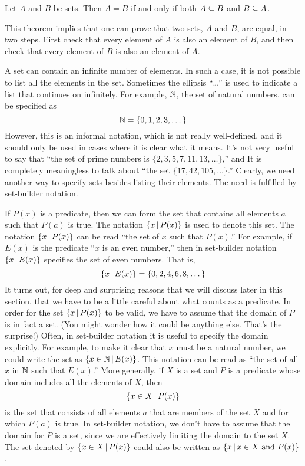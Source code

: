 \begin{theorem}\label{T-setequality}
Let $A$ and $B$ be sets.  Then $A=B$ if and only if both $A\subseteq B$ and $B\subseteq A$.
\end{theorem}

This theorem implies that one can prove that two sets, $A$ and $B$, are equal, in two steps.
First check that every element of $A$ is also an element of $B$, and then check that every element of $B$ is also an element of $A$.
 
\medbreak

A set can contain an infinite number of elements.
In such a case, it is not possible to list all the elements in the set.
Sometimes the ellipsis ``\dots'' is used to indicate a list that continues on infinitely.
For example, ${\mathbb N}$, the set of natural numbers, can be specified as
\[{\mathbb N} = \{ 0, 1, 2, 3, \dots \}\]
However, this is an informal notation, which is not really well-defined, and it should only be used in cases where it is clear what it means.
It's not very useful to say that ``the set of prime numbers is $\{2,3,5,7,11,13,\dots\}$,'' and It is completely meaningless to talk about ``the set $\{17,42,105,\dots\}$.''
Clearly, we need another way to specify sets besides listing their elements.
The need is fulfilled by set-builder notation.

If $P(x)$ is a predicate, then we can form the set that contains all elements $a$ such that $P(a)$ is true.
The notation $\{x \,|\, P(x)\}$ is used to denote this set.
The notation $\{x\,|\, P(x)\}$ can be read ``the set of $x$ such that $P(x)$.''
For example, if $E(x)$ is the predicate ``$x$ is an even number,'' then in set-builder notation $\{x\,|\, E(x)\}$ specifies the set of even numbers.
That is, 
\[\{x\,|\, E(x)\} = \{0,2,4,6,8,\dots\}\]
It turns out, for deep and surprising reasons that we will discuss later in this
section, that we have to be a little careful about what counts as a predicate.  
In order for the set $\{x\,|\, P(x)\}$ to be valid, we have to assume that the domain of $P$ is in fact a set.  
(You might wonder how it could be anything else.  That's the surprise!)
Often, in set-builder notation it is useful to specify the domain explicitly.
For example, to make it clear that $x$ must be a natural number, we could write the set as $\{x\in{\mathbb N} \,|\,  E(x)\}$.
This notation can be read as ``the set of all $x$ in ${\mathbb N}$ such that $E(x)$.''
More generally, if $X$ is a set and $P$ is a predicate whose domain includes all the elements of $X$, then 
\[\{x\in X\,|\, P(x)\}\]
is the set that consists of all elements $a$ that are members of the set $X$ and for which $P(a)$ is true.
In set-builder notation, we don't have to assume that the domain for $P$ is a set, since we are effectively limiting the domain to the set $X$.
The set denoted by $\{x\in X\,|\, P(x)\}$ could also be written as $\{x\,|\, x\in X\text{ and } P(x)\}$.

